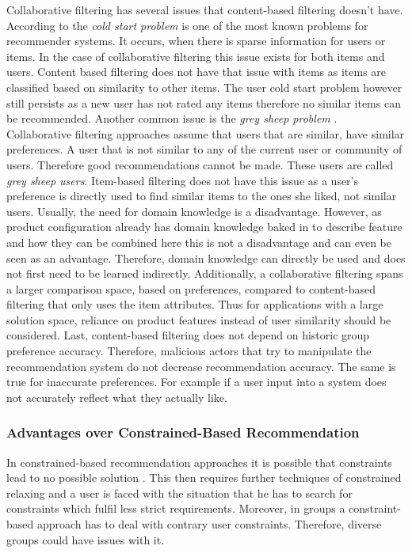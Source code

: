 Collaborative filtering has several issues that content-based filtering doesn't have. According to \citeauthor{likaFacingColdStart2014} \cite{likaFacingColdStart2014} the \emph{cold start problem} is one of the most known problems for recommender systems. It occurs, when there is sparse information for users or items. In the case of collaborative filtering this issue exists for both items and users. Content based filtering does not have that issue with items as items are classified based on similarity to other items. The user cold start problem however still persists as a new user has not rated any items therefore no similar items can be recommended. 
Another common issue is the \emph{grey sheep problem} \citeauthor{grasIdentifyingGreySheep2016} \cite{grasIdentifyingGreySheep2016}. Collaborative filtering approaches assume that users that are similar, have similar preferences. A user that is not similar to any of the current user or community of users. Therefore good recommendations cannot be made. These users are called \emph{grey sheep users}. Item-based filtering does not have this issue as a user's preference is directly used to find similar items to the ones she liked, not similar users.
Usually, the need for domain knowledge is a disadvantage. However, as product configuration already has domain knowledge baked in to describe feature and how they can be combined here this is not a disadvantage and can even be seen as an advantage. Therefore, domain knowledge can directly be used and does not first need to be learned indirectly.
Additionally, a collaborative filtering spans a larger comparison space, based on preferences, compared to content-based filtering that only uses the item attributes. Thus for applications with a large solution space, reliance on product features instead of user similarity should be considered.
Last, content-based filtering does not depend on historic group preference accuracy. Therefore, malicious actors that try to manipulate the recommendation system do not decrease recommendation accuracy. The same is true for inaccurate preferences. For example if a user input into a system does not accurately reflect what they actually like.

\subsubsection{Advantages over Constrained-Based Recommendation}

In constrained-based recommendation approaches it is possible that constraints lead to no possible solution \cite[~ p. 44]{felfernigAlgorithmsGroupRecommendation2018}. This then requires further techniques of constrained relaxing and a user is faced with the situation that he has to search for constraints which fulfil less strict requirements. Moreover, in groups a constraint-based approach has to deal with contrary user constraints. Therefore, diverse groups could have issues with it.

